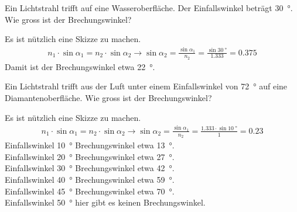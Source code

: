 \documentclass[paper=a4,twoside=true,,DIV13,BCOR1cm]{scrartcl}
\begin{document}
\begin{aufgabe}
	Ein Lichtstrahl trifft auf eine Wasseroberfläche. Der Einfallswinkel beträgt \SI{30}{\degree}. Wie gross ist der Brechungswinkel?
	\begin{loesung}
		Es ist nützlich eine Skizze zu machen.
		\begin{eqnarray*}
			n_1\cdot\sin\alpha_1 = n_2\cdot\sin\alpha_2 \to \sin\alpha_2=\frac{\sin\alpha_1}{n_2}=\frac{\sin\SI{30}{\degree}}{\num{1.333}}=\num{0.375}
		\end{eqnarray*}
		Damit ist der Brechungswinkel etwa \SI{22}{\degree}.
	\end{loesung}
\end{aufgabe}

\begin{aufgabe}
	Ein Lichtstrahl trifft aus der Luft unter einem Einfallswinkel von \SI{72}{\degree} auf eine Diamantenoberfläche.
	Wie gross ist der Brechungswinkel?
\end{aufgabe}


\begin{loesung}
		Es ist nützlich eine Skizze zu machen.
		\begin{eqnarray*}
			n_1\cdot\sin\alpha_1 = n_2\cdot\sin\alpha_2 \to \sin\alpha_2=\frac{\sin\alpha_1}{n_2}=\frac{\num{1.333}\cdot\sin\SI{10}{\degree}}{1}=\num{0.23}
		\end{eqnarray*}
		Einfallswinkel \SI{10}{\degree} Brechungswinkel etwa \SI{13}{\degree}.\\
		Einfallswinkel \SI{20}{\degree} Brechungswinkel etwa \SI{27}{\degree}.\\
		Einfallswinkel \SI{30}{\degree} Brechungswinkel etwa \SI{42}{\degree}.\\
		Einfallswinkel \SI{40}{\degree} Brechungswinkel etwa \SI{59}{\degree}.\\
		Einfallswinkel \SI{45}{\degree} Brechungswinkel etwa \SI{70}{\degree}.\\
		Einfallswinkel \SI{50}{\degree} hier gibt es keinen Brechungswinkel.
\end{loesung}
\end{document}
